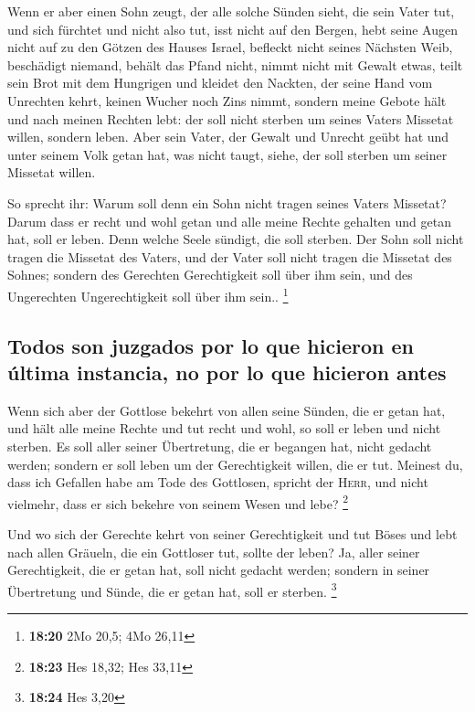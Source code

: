  Wenn er aber einen Sohn zeugt, der alle solche Sünden
sieht, die sein Vater tut, und sich fürchtet und nicht also tut,
 isst nicht auf den Bergen, hebt seine Augen nicht auf zu
den Götzen des Hauses Israel, befleckt nicht seines Nächsten Weib,
 beschädigt niemand, behält das Pfand nicht, nimmt nicht
mit Gewalt etwas, teilt sein Brot mit dem Hungrigen und kleidet den
Nackten,  der seine Hand vom Unrechten kehrt, keinen
Wucher noch Zins nimmt, sondern meine Gebote hält und nach meinen
Rechten lebt: der soll nicht sterben um seines Vaters Missetat willen,
sondern leben.  Aber sein Vater, der Gewalt und Unrecht
geübt hat und unter seinem Volk getan hat, was nicht taugt, siehe, der
soll sterben um seiner Missetat willen.

 So sprecht ihr: Warum soll denn ein Sohn nicht tragen
seines Vaters Missetat? Darum dass er recht und wohl getan und alle
meine Rechte gehalten und getan hat, soll er leben.  Denn
welche Seele sündigt, die soll sterben. Der Sohn soll nicht tragen die
Missetat des Vaters, und der Vater soll nicht tragen die Missetat des
Sohnes; sondern des Gerechten Gerechtigkeit soll über ihm sein, und des
Ungerechten Ungerechtigkeit soll über ihm sein.. \footnote{\textbf{18:20}
  2Mo 20,5; 4Mo 26,11}

\hypertarget{todos-son-juzgados-por-lo-que-hicieron-en-uxfaltima-instancia-no-por-lo-que-hicieron-antes}{%
\subsection{Todos son juzgados por lo que hicieron en última instancia,
no por lo que hicieron
antes}\label{todos-son-juzgados-por-lo-que-hicieron-en-uxfaltima-instancia-no-por-lo-que-hicieron-antes}}

 Wenn sich aber der Gottlose bekehrt von allen seine
Sünden, die er getan hat, und hält alle meine Rechte und tut recht und
wohl, so soll er leben und nicht sterben.  Es soll aller
seiner Übertretung, die er begangen hat, nicht gedacht werden; sondern
er soll leben um der Gerechtigkeit willen, die er tut. 
Meinest du, dass ich Gefallen habe am Tode des Gottlosen, spricht der
\textsc{Herr}, und nicht vielmehr, dass er sich bekehre von seinem Wesen
und lebe? \footnote{\textbf{18:23} Hes 18,32; Hes 33,11}

 Und wo sich der Gerechte kehrt von seiner Gerechtigkeit
und tut Böses und lebt nach allen Gräueln, die ein Gottloser tut, sollte
der leben? Ja, aller seiner Gerechtigkeit, die er getan hat, soll nicht
gedacht werden; sondern in seiner Übertretung und Sünde, die er getan
hat, soll er sterben. \footnote{\textbf{18:24} Hes 3,20}

